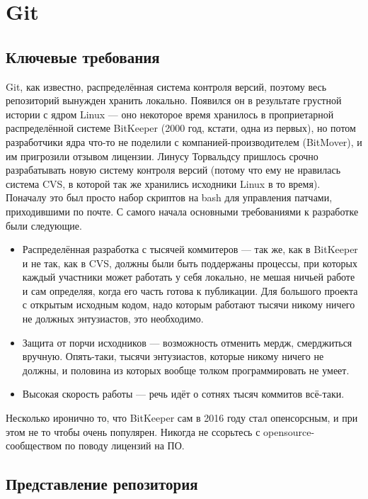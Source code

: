 \documentclass[a5paper]{article}
\begin{document}
\section{Git}

\subsection{Ключевые требования}

Git, как известно, распределённая система контроля версий, поэтому весь репозиторий вынужден хранить локально. Появился он в результате грустной истории с ядром Linux --- оно некоторое время хранилось в проприетарной распределённой системе BitKeeper (2000 год, кстати, одна из первых), но потом разработчики ядра что-то не поделили с компанией-производителем (BitMover), и им пригрозили отзывом лицензии. Линусу Торвальдсу пришлось срочно разрабатывать новую систему контроля версий (потому что ему не нравилась система CVS, в которой так же хранились исходники Linux в то время). Поначалу это был просто набор скриптов на bash для управления патчами, приходившими по почте. С самого начала основными требованиями к разработке были следующие.

\begin{itemize}
    \item Распределённая разработка с тысячей коммитеров --- так же, как в BitKeeper и не так, как в CVS, должны были быть поддержаны процессы, при которых каждый участники может работать у себя локально, не мешая ничьей работе и сам определяя, когда его часть готова к публикации. Для большого проекта с открытым исходным кодом, надо которым работают тысячи никому ничего не должных энтузиастов, это необходимо.
    \item Защита от порчи исходников --- возможность отменить мердж, смерджиться вручную. Опять-таки, тысячи энтузиастов, которые никому ничего не должны, и половина из которых вообще толком программировать не умеет.
    \item Высокая скорость работы --- речь идёт о сотнях тысяч коммитов всё-таки.
\end{itemize}

Несколько иронично то, что BitKeeper сам в 2016 году стал опенсорсным, и при этом не то чтобы очень популярен. Никогда не ссорьтесь с opensource-сообществом по поводу лицензий на ПО.

\subsection{Представление репозитория}
\end{document}
